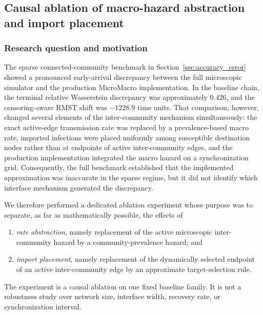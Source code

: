 
\subsection{Causal ablation of macro-hazard abstraction and import placement}
\label{sec:hazard_placement_ablation}

\subsubsection{Research question and motivation}

The sparse connected-community benchmark in Section~\ref{sec:accuracy_error} showed a pronounced early-arrival discrepancy between the full microscopic simulator and the production MicroMacro implementation.  In the baseline chain, the terminal relative Wasserstein discrepancy was approximately $0.426$, and the censoring-aware RMST shift was $-1228.9$ time units.  That comparison, however, changed several elements of the inter-community mechanism simultaneously: the exact active-edge transmission rate was replaced by a prevalence-based macro rate, imported infections were placed uniformly among susceptible destination nodes rather than at endpoints of active inter-community edges, and the production implementation integrated the macro hazard on a synchronization grid.  Consequently, the full benchmark established that the implemented approximation was inaccurate in the sparse regime, but it did not identify which interface mechanism generated the discrepancy.

We therefore performed a dedicated ablation experiment whose purpose was to separate, as far as mathematically possible, the effects of
\begin{enumerate}
    \item \emph{rate abstraction}, namely replacement of the active microscopic inter-community hazard by a community-prevalence hazard; and
    \item \emph{import placement}, namely replacement of the dynamically selected endpoint of an active inter-community edge by an approximate target-selection rule.
\end{enumerate}
The experiment is a causal ablation on one fixed baseline family.  It is not a robustness study over network size, interface width, recovery rate, or synchronization interval.

